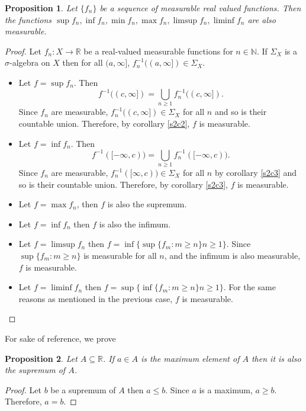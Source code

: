 \documentclass{article}
\newcommand{\sor}{\mathbb{R}}
\newcommand{\son}{\mathbb{N}}
\theoremstyle{plain}
\numberwithin{thm}{section}
\theoremstyle{plain}
\newtheorem{prop}{Proposition}
\numberwithin{prop}{section}
\theoremstyle{definition}
\numberwithin{defn}{section}
\theoremstyle{remark}
\theoremstyle{plain}
\numberwithin{cor}{section}
\numberwithin{equation}{section}
\begin{document}
\begin{prop}\label{s2p4}
Let $\{f_n\}$ be a sequence of measurable real valued functions. Then the functions
$\sup f_n, \inf f_n, \min f_n, \max f_n, \limsup f_n, \liminf f_n$ are also
measurable.
\end{prop}
\begin{proof}
Let $f_n: X \rightarrow \sor$ be a real-valued measurable functions for $n \in
\son$. If $\Sigma_X$ is a $\sigma$-algebra on $X$ then for all $(a, \infty]$,
$f_n^{-1}((a, \infty]) \in \Sigma_X$.
\begin{itemize}
\item Let $f = \sup f_n$. Then 
\[
f^{-1}((c, \infty]) = \bigcup_{n \ge 1}f_n^{-1}((c, \infty]).
\]
Since $f_n$ are measurable, $f_n^{-1}((c, \infty]) \in \Sigma_X$ for all $n$
and so is their countable union. Therefore, by corollary \ref{s2c2}, $f$ is 
measurable.

\item Let $f = \inf f_n$. Then 
\[
f^{-1}([-\infty, c)) = \bigcup_{n \ge 1}f_n^{-1}([-\infty, c)).
\]
Since $f_n$ are measurable, $f_n^{-1}([\infty, c)) \in \Sigma_X$ for all $n$
by corollary \ref{s2c3} and so is their countable union. Therefore, by corollary 
\ref{s2c3}, $f$ is measurable.

\item Let $f = \max f_n$, then $f$ is also the supremum.

\item Let $f = \inf f_n$ then $f$ is also the infimum.

\item Let $f = \limsup f_n$ then $f = \inf\{\sup\{f_m : m \ge n\} n \ge 1\}$.
Since $\sup\{f_m : m \ge n\}$ is measurable for all $n$, and the infimum is
also measurable, $f$ is measurable.

\item Let $f = \liminf f_n$ then $f = \sup\{\inf\{f_m : m \ge n\} n \ge 1\}$.
For the same reasons as mentioned in the previous case, $f$ is measurable.

\end{itemize}
\end{proof}

For sake of reference, we prove
\begin{prop}\label{s2p5}
Let $A \subseteq \sor$. If $a \in A$ is the maximum element of $A$ then it is also
the supremum of $A$.
\end{prop}
\begin{proof}
Let $b$ be a supremum of $A$ then $a \le b$. Since $a$ is a maximum, $a \ge b$.
Therefore, $a = b$.
\end{proof}
\end{document}
